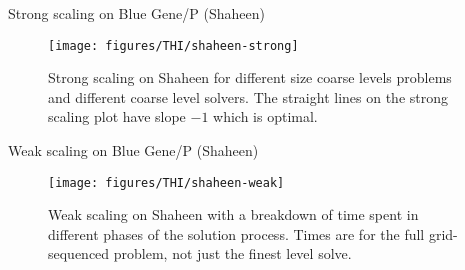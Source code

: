 \begin{frame}{Strong scaling on Blue Gene/P (Shaheen)}
\begin{figure}
  \texttt{[image: figures/THI/shaheen-strong]}
  \centering\caption{Strong scaling on Shaheen for different size coarse levels problems and different coarse level solvers.
    The straight lines on the strong scaling plot have slope $-1$ which is optimal.}\label{fig:shaheen-strong}
\end{figure}
\end{frame}

\begin{frame}{Weak scaling on Blue Gene/P (Shaheen)}
  \begin{figure}
  \texttt{[image: figures/THI/shaheen-weak]}
  \centering\caption{Weak scaling on Shaheen with a breakdown of time spent in different phases of the solution process.
    Times are for the full grid-sequenced problem, not just the finest level solve.}\label{fig:shaheen-weak}
\end{figure}
\end{frame}
